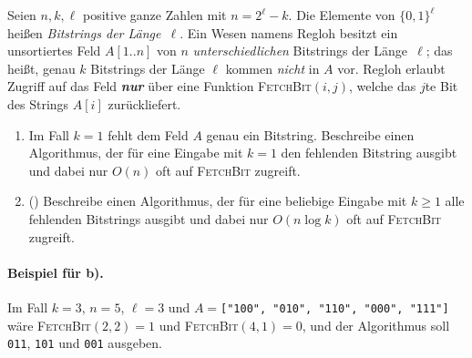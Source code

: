 \documentclass{uebung_cs}
\begin{document}
\begin{aufgabe}
  Seien $n,k,\ell$ positive ganze Zahlen mit $n=2^\ell-k$.
  Die Elemente von $\{0,1\}^\ell$ heißen \emph{Bitstrings der Länge~$\ell$}.
  Ein Wesen namens Regloh besitzt ein unsortiertes Feld $A[1..n]$ von $n$ \emph{unterschiedlichen} Bitstrings der Länge~$\ell$; das heißt, genau $k$ Bitstrings der Länge $\ell$ kommen \emph{nicht} in $A$ vor.
  Regloh erlaubt Zugriff auf das Feld \emph{\textbf{nur}} über eine Funktion \textsc{FetchBit}$(i,j)$, welche das $j$te Bit des Strings $A[i]$ zurückliefert.
  \begin{enumerate}
    \item \mittel Im Fall $k=1$ fehlt dem Feld $A$ genau ein Bitstring. Beschreibe einen Algorithmus, der für eine Eingabe mit $k=1$ den fehlenden Bitstring ausgibt und dabei nur $O(n)$ oft auf \textsc{FetchBit} zugreift.
    \item \note (\hard) Beschreibe einen Algorithmus, der für eine beliebige Eingabe mit $k\ge 1$ alle fehlenden Bitstrings ausgibt und dabei nur $O(n\log k)$ oft auf \textsc{FetchBit} zugreift.
  \end{enumerate}

  \paragraph{Beispiel für b).}
  Im Fall $k=3$, $n=5$, $\ell=3$ und $A=$\texttt{["100", "010", "110", "000", "111"]}
  wäre \textsc{FetchBit}$(2,2)=1$ und \textsc{FetchBit}$(4,1)=0$, und der Algorithmus soll \texttt{011}, \texttt{101} und \texttt{001} ausgeben.

\end{aufgabe}
\end{document}
